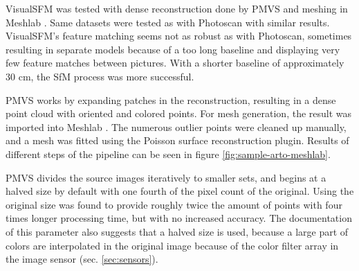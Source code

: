 



VisualSFM \cite{visualsfm} was tested with dense reconstruction done by PMVS \cite{pmvs} and meshing in Meshlab \cite{meshlab}.
Same datasets were tested as with Photoscan with similar results.
VisualSFM's feature matching seems not as robust as with Photoscan, sometimes resulting in separate models because of a too long baseline and displaying very few feature matches between pictures.
With a shorter baseline of approximately 30 cm, the SfM process was more successful.

PMVS \cite{pmvs} works by expanding patches in the reconstruction, resulting in a dense point cloud with oriented and colored points.
For mesh generation, the result was imported into Meshlab \cite{meshlab}.
The numerous outlier points were cleaned up manually, and a mesh was fitted using the Poisson surface reconstruction plugin.
Results of different steps of the pipeline can be seen in figure \ref{fig:sample-arto-meshlab}.

PMVS divides the source images iteratively to smaller sets, and begins at a halved size by default with one fourth of the pixel count of the original.
Using the original size was found to provide roughly twice the amount of points with four times longer processing time, but with no increased accuracy.
The documentation of this parameter also suggests that a halved size is used, because a large part of colors are interpolated in the original image because of the color filter array in the image sensor (sec. \ref{sec:sensors}).

